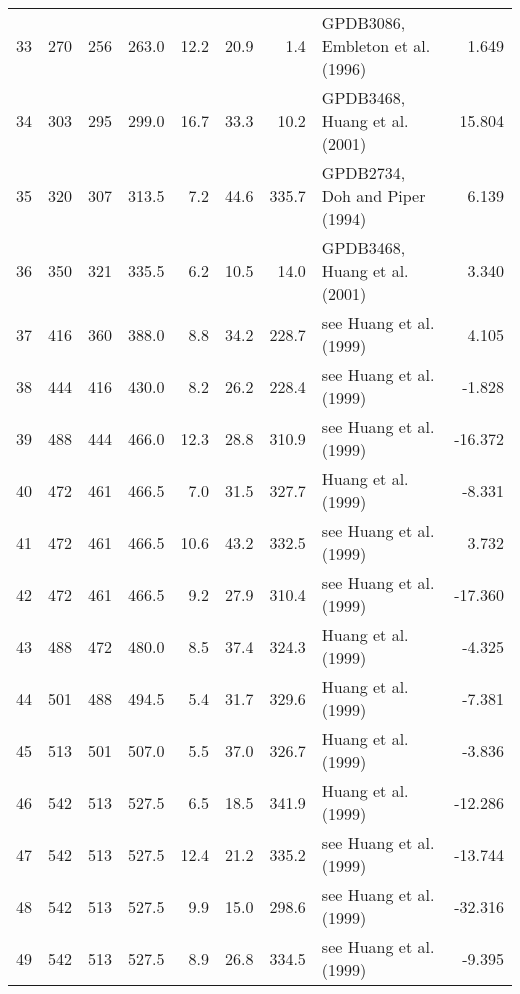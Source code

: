\documentclass[11pt]{article}
\begin{document}
{\begin{tabular}{lrrrrrrlr}
33 &       270 &      256 &       263.0 &  12.2 &  20.9 &    1.4 &  GPDB3086, Embleton et al. (1996) &     1.649 \\
34 &       303 &      295 &       299.0 &  16.7 &  33.3 &   10.2 &     GPDB3468, Huang et al. (2001) &    15.804 \\
35 &       320 &      307 &       313.5 &   7.2 &  44.6 &  335.7 &    GPDB2734, Doh and Piper (1994) &     6.139 \\
36 &       350 &      321 &       335.5 &   6.2 &  10.5 &   14.0 &     GPDB3468, Huang et al. (2001) &     3.340 \\
37 &       416 &      360 &       388.0 &   8.8 &  34.2 &  228.7 &           see Huang et al. (1999) &     4.105 \\
38 &       444 &      416 &       430.0 &   8.2 &  26.2 &  228.4 &           see Huang et al. (1999) &    -1.828 \\
39 &       488 &      444 &       466.0 &  12.3 &  28.8 &  310.9 &           see Huang et al. (1999) &   -16.372 \\
40 &       472 &      461 &       466.5 &   7.0 &  31.5 &  327.7 &               Huang et al. (1999) &    -8.331 \\
41 &       472 &      461 &       466.5 &  10.6 &  43.2 &  332.5 &           see Huang et al. (1999) &     3.732 \\
42 &       472 &      461 &       466.5 &   9.2 &  27.9 &  310.4 &           see Huang et al. (1999) &   -17.360 \\
43 &       488 &      472 &       480.0 &   8.5 &  37.4 &  324.3 &               Huang et al. (1999) &    -4.325 \\
44 &       501 &      488 &       494.5 &   5.4 &  31.7 &  329.6 &               Huang et al. (1999) &    -7.381 \\
45 &       513 &      501 &       507.0 &   5.5 &  37.0 &  326.7 &               Huang et al. (1999) &    -3.836 \\
46 &       542 &      513 &       527.5 &   6.5 &  18.5 &  341.9 &               Huang et al. (1999) &   -12.286 \\
47 &       542 &      513 &       527.5 &  12.4 &  21.2 &  335.2 &           see Huang et al. (1999) &   -13.744 \\
48 &       542 &      513 &       527.5 &   9.9 &  15.0 &  298.6 &           see Huang et al. (1999) &   -32.316 \\
49 &       542 &      513 &       527.5 &   8.9 &  26.8 &  334.5 &           see Huang et al. (1999) &    -9.395 \\
\bottomrule
\end{tabular}}
\end{document}
